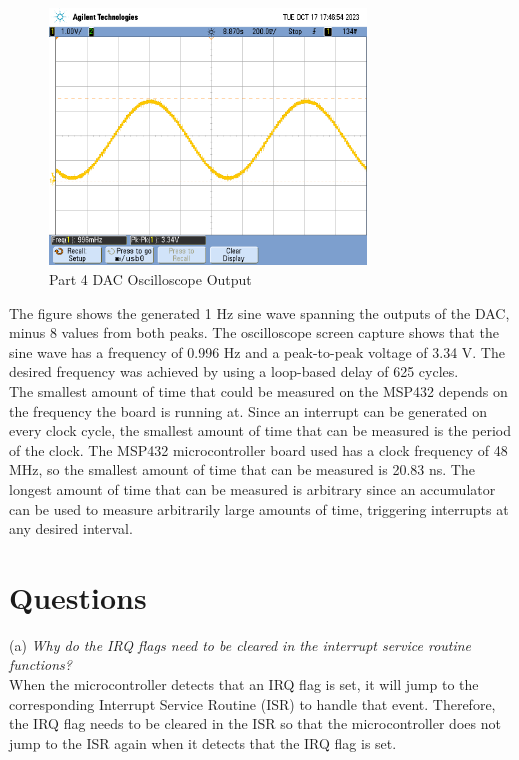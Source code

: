 \documentclass[CMPE]{KGCOEReport}
\begin{document}
\begin{figure}[H]
    \centering
    \includegraphics[width=0.75\textwidth]{part4.png}
    \caption{Part 4 DAC Oscilloscope Output}
    \label{fig:part4}
\end{figure}

The figure shows the generated 1 Hz sine wave spanning the outputs of the DAC, minus 8 values from both peaks. The oscilloscope screen capture shows that the sine wave has a frequency of 0.996 Hz and a peak-to-peak voltage of 3.34 V. The desired frequency was achieved by using a loop-based delay of 625 cycles.\\

The smallest amount of time that could be measured on the MSP432 depends on the frequency the board is running at. Since an interrupt can be generated on every clock cycle, the smallest amount of time that can be measured is the period of the clock. The MSP432 microcontroller board used has a clock frequency of 48 MHz, so the smallest amount of time that can be measured is 20.83 ns. The longest amount of time that can be measured is arbitrary since an accumulator can be used to measure arbitrarily large amounts of time, triggering interrupts at any desired interval.\\


\section*{Questions}

(a) \emph{Why do the IRQ flags need to be cleared in the interrupt service routine functions?}\\

When the microcontroller detects that an IRQ flag is set, it will jump to the corresponding Interrupt Service Routine (ISR) to handle that event. Therefore, the IRQ flag needs to be cleared in the ISR so that the microcontroller does not jump to the ISR again when it detects that the IRQ flag is set.
\bigskip
\end{document}
